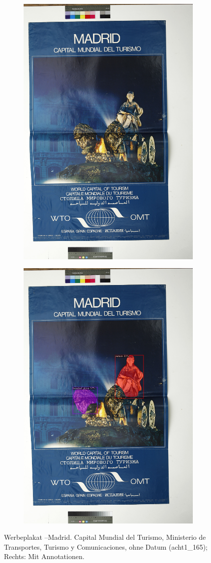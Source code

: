 \documentclass[a4paper,12pt,ngerman]{article}
\begin{document}
\newpage
\begin{landscape}
\begin{figure}[ht]
	\begin{subfigure}[b]{0.5\linewidth}
	\centering
	\includegraphics[height=\linewidth]{Abbildung_25_(acht1_165)}
	\end{subfigure}
	\begin{subfigure}[b]{0.5\linewidth}
	\centering
	\includegraphics[height=\linewidth]{Abbildung_25_(acht1_165)_with_detections}
	\end{subfigure}
	\caption{Werbeplakat --Madrid. Capital Mundial del Turismo, Ministerio de Transportes, Turismo y Comunicaciones, ohne Datum (acht1\_165); Rechts: Mit Annotationen.}
\end{figure}
\end{landscape}
\end{document}
